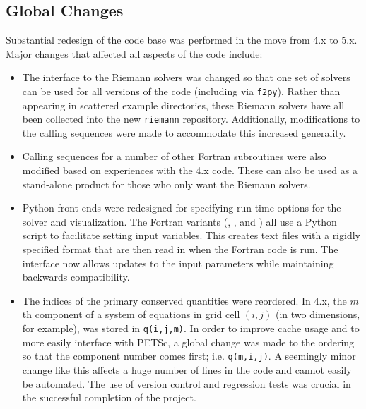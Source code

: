 %
%
%

\subsection{Global Changes}
Substantial redesign of the \clawpack code base was performed in the move
from \clawpack 4.x to 5.x.
Major changes that affected all aspects of the code include:
\begin{itemize}
    \item The interface to the \clawpack Riemann solvers was changed so that one
    set of solvers can be used for all versions of the code (including \pyclaw
    via \texttt{f2py}).  Rather than appearing in scattered example directories,
    these Riemann solvers have all been collected into the new
    \texttt{riemann} repository. Additionally, modifications to the
    calling sequences were made to accommodate this increased generality.
    \item Calling sequences for a number of other Fortran subroutines were also
    modified based on experiences with the \clawpack 4.x code.  These can also
    be used as a stand-alone product for those who only want the Riemann
    solvers.
    \item Python front-ends were redesigned for specifying run-time options for
    the solver and visualization.  The Fortran variants (\classic, \amrclaw, and
    \geoclaw) all use a Python script to facilitate setting input variables.
    This creates text files with a rigidly specified format that are then read
    in when the Fortran code is run. The interface now allows updates to the
    input parameters while maintaining backwards compatibility.
    \item The indices of the primary conserved quantities were reordered.  In
    \clawpack 4.x, the $m$th component of a
    system of equations in grid cell $(i,j)$ (in two dimensions, for example),
    was stored in \texttt{q(i,j,m)}.  In order to improve cache usage and to
    more easily interface with PETSc, a global
    change was made to the ordering so that the component number comes
    first; i.e. \texttt{q(m,i,j)}.  A seemingly minor change like this affects a
    huge number of lines in the code and cannot easily be automated. The use of
    version control and regression tests was crucial in the successful
    completion of the project.
\end{itemize}